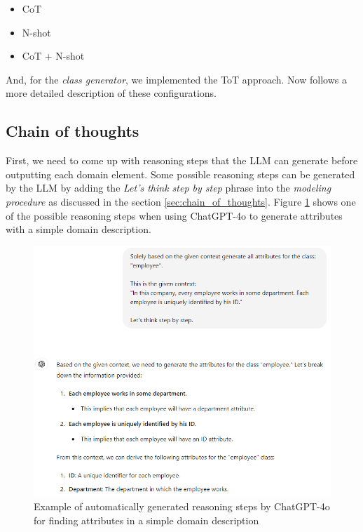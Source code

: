 \begin{itemize}
\item CoT
\item N-shot
\item CoT + N-shot
\end{itemize}

\noindent{}And, for the \emph{class generator}, we implemented the ToT approach. Now follows a more detailed description of these configurations.


\subsection{Chain of thoughts}

First, we need to come up with reasoning steps that the LLM can generate before outputting each domain element. Some possible reasoning steps can be generated by the LLM by adding the \textit{Let's think step by step} phrase into the \emph{modeling procedure} as discussed in the section \ref{sec:chain_of_thoughts}. Figure \ref{fig:cot-think-step-by-step} shows one of the possible reasoning steps when using ChatGPT-4o to generate attributes with a simple domain description.

\begin{figure}[!h]
    \centering
    \includegraphics[scale=0.6]{img/cot-think-step-by-step.png}
    \caption{\centering Example of automatically generated reasoning steps by ChatGPT-4o for finding attributes in a simple domain description}
    \label{fig:cot-think-step-by-step}
\end{figure}

